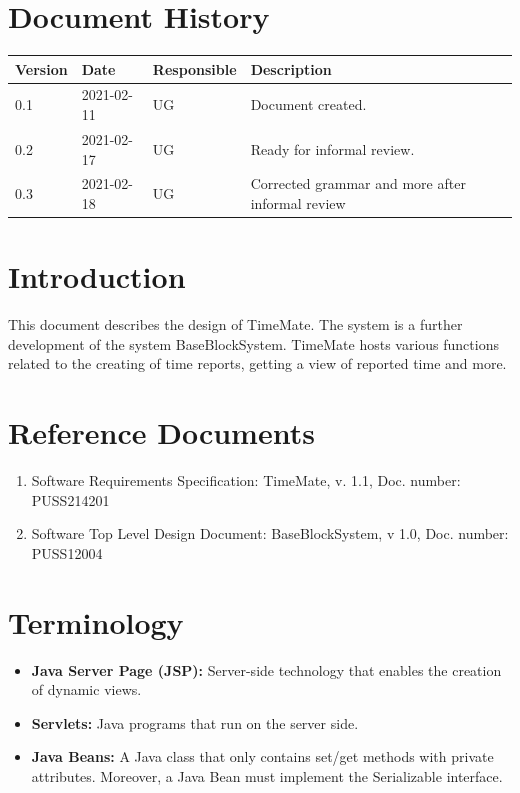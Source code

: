 \documentclass{article}
\date {#1}
\title {
    \documentNumber {01}    
    
    \documentVersion {0.3}
    
    \documentTitle {Software Top Level Design Document}
    \documentGroup {2}
    
    \documentResponsible {System Group}
    \documentAuthors {Developer Group}
    
    \documentDate {2021-02-18}
}
\begin{document}
\maketitle
\thispagestyle{empty}

\newpage

\tableofcontents

\newpage


\section{Document History}
\begin{tabular}{ l | l | l | l }
    Version & Date & Responsible & Description \\
    \hline
    0.1 & 2021-02-11 & UG & Document created. \\
    \hline
    0.2 & 2021-02-17 & UG & Ready for informal review. \\
    \hline
    0.3 & 2021-02-18 & UG & Corrected grammar and more after informal review \\
\end{tabular}

\section{Introduction}
This document describes the design of TimeMate. The system is a further development of the system BaseBlockSystem. TimeMate hosts various functions related to the creating of time reports, getting a view of reported time and more.

\section{Reference Documents}
\begin{enumerate}
    \item Software Requirements Specification: TimeMate, v. 1.1, Doc. number: PUSS214201
    \item Software Top Level Design Document: BaseBlockSystem, v 1.0, Doc. number: PUSS12004
\end{enumerate}

\section{Terminology}
\begin{itemize}
\item \textbf{Java Server Page (JSP):} Server-side technology that enables the creation of dynamic views.
\item \textbf{Servlets:} Java programs that run on the server side.
\item \textbf{Java Beans:} A Java class that only contains set/get methods with private attributes. Moreover, a Java Bean must implement the Serializable interface.
\end{itemize}
\end{document}
